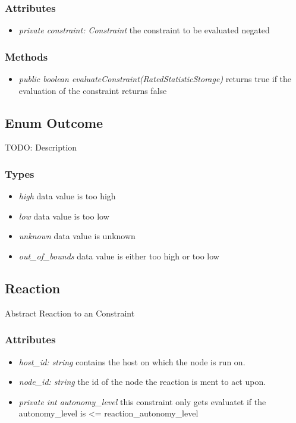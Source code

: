 \subsubsection{Attributes}
\begin{itemize}
	\item \textit{ private constraint: Constraint }
	the constraint to be evaluated negated
\end{itemize}
\subsubsection{Methods}
\begin{itemize}
	\item \textit{ public boolean evaluateConstraint(RatedStatisticStorage) }
	returns true if the evaluation of the constraint returns false
\end{itemize}

\subsection{Enum Outcome }
TODO: Description

\subsubsection{Types}
\begin{itemize}
	\item \textit{ high }
	data value is too high
	\item \textit{ low }
	data value is too low
	\item \textit{ unknown }
	data value is unknown
	\item \textit{ out\_of\_bounds }
	data value is either too high or too low
\end{itemize}


\subsection{Reaction}
	Abstract Reaction to an Constraint
\subsubsection{Attributes}
\begin{itemize}
	\item \textit{ host\_id: string  }
		contains the host on which the node is run on.
	\item \textit{ node\_id: string  }
		the id of the node the reaction is ment to act upon.
	\item \textit{ private  int autonomy\_level }
		this constraint only gets evaluatet if 
		the autonomy\_level is <= reaction\_autonomy\_level
\end{itemize}
